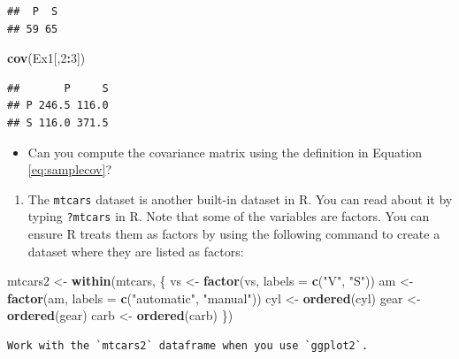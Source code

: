 \documentclass[]{book}
\newenvironment{Shaded}{\begin{snugshade}}{\end{snugshade}}
\newcommand{\DataTypeTok}[1]{\textcolor[rgb]{0.13,0.29,0.53}{#1}}
\newcommand{\DecValTok}[1]{\textcolor[rgb]{0.00,0.00,0.81}{#1}}
\newcommand{\KeywordTok}[1]{\textcolor[rgb]{0.13,0.29,0.53}{\textbf{#1}}}
\newcommand{\NormalTok}[1]{#1}
\newcommand{\OperatorTok}[1]{\textcolor[rgb]{0.81,0.36,0.00}{\textbf{#1}}}
\newcommand{\StringTok}[1]{\textcolor[rgb]{0.31,0.60,0.02}{#1}}
\providecommand{\tightlist}{%
  \setlength{\itemsep}{0pt}\setlength{\parskip}{0pt}}
\theoremstyle{definition}
\theoremstyle{definition}
\theoremstyle{definition}
\theoremstyle{remark}
\begin{document}
\begin{verbatim}
##  P  S 
## 59 65
\end{verbatim}

\begin{Shaded}
\begin{Highlighting}[]
\KeywordTok{cov}\NormalTok{(Ex1[,}\DecValTok{2}\OperatorTok{:}\DecValTok{3}\NormalTok{])}
\end{Highlighting}
\end{Shaded}

\begin{verbatim}
##       P     S
## P 246.5 116.0
## S 116.0 371.5
\end{verbatim}

\begin{itemize}
\tightlist
\item
  Can you compute the covariance matrix using the definition in Equation \eqref{eq:samplecov}?
\end{itemize}

\begin{enumerate}
\def\labelenumi{\arabic{enumi}.}
\setcounter{enumi}{2}
\tightlist
\item
  The \texttt{mtcars} dataset is another built-in dataset in R. You can read about it by typing \texttt{?mtcars} in R. Note that some of the variables are factors. You can ensure R treats them as factors by using the following command to create a dataset where they are listed as factors:
\end{enumerate}

\begin{Shaded}
\begin{Highlighting}[]
\NormalTok{mtcars2 <-}\StringTok{ }\KeywordTok{within}\NormalTok{(mtcars, \{}
\NormalTok{   vs <-}\StringTok{ }\KeywordTok{factor}\NormalTok{(vs, }\DataTypeTok{labels =} \KeywordTok{c}\NormalTok{(}\StringTok{"V"}\NormalTok{, }\StringTok{"S"}\NormalTok{))}
\NormalTok{   am <-}\StringTok{ }\KeywordTok{factor}\NormalTok{(am, }\DataTypeTok{labels =} \KeywordTok{c}\NormalTok{(}\StringTok{"automatic"}\NormalTok{, }\StringTok{"manual"}\NormalTok{))}
\NormalTok{   cyl  <-}\StringTok{ }\KeywordTok{ordered}\NormalTok{(cyl)}
\NormalTok{   gear <-}\StringTok{ }\KeywordTok{ordered}\NormalTok{(gear)}
\NormalTok{   carb <-}\StringTok{ }\KeywordTok{ordered}\NormalTok{(carb)}
\NormalTok{\})}
\end{Highlighting}
\end{Shaded}

\begin{verbatim}
Work with the `mtcars2` dataframe when you use `ggplot2`.
\end{verbatim}
\end{document}
